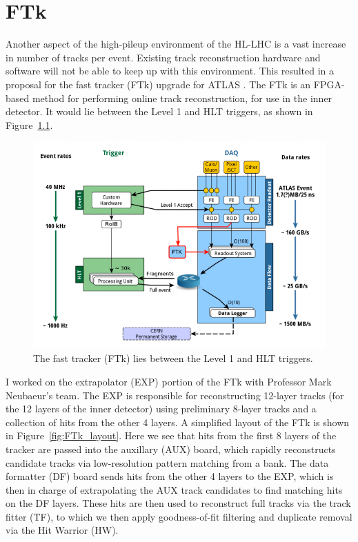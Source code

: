 \chapter{FTk}

Another aspect of the high-pileup environment of the HL-LHC is a vast increase in number of tracks per event. Existing track reconstruction hardware and software will not be able to keep up with this environment. This resulted in a proposal for the fast tracker (FTk) upgrade for ATLAS \cite{FTk}. The FTk is an FPGA-based method for performing online track reconstruction, for use in the inner detector. It would lie between the Level 1 and HLT triggers, as shown in Figure~\ref{fig:FTk_location}.

\begin{figure}[htbp]
    \centering
    \includegraphics[width=\linewidth]{Images/Other/FTk_location.png}
    \caption{The fast tracker (FTk) lies between the Level 1 and HLT triggers.}
    \label{fig:FTk_location}
\end{figure}

I worked on the extrapolator (EXP) portion of the FTk with Professor Mark Neubaeur's team. The EXP is responsible for reconstructing 12-layer tracks (for the 12 layers of the inner detector) using preliminary 8-layer tracks and a collection of hits from the other 4 layers. A simplified layout of the FTk is shown in Figure~\ref{fig:FTk_layout}. Here we see that hits from the first 8 layers of the tracker are passed into the auxillary (AUX) board, which rapidly reconstructs candidate tracks via low-resolution pattern matching from a bank. The data formatter (DF) board sends hits from the other 4 layers to the EXP, which is then in charge of extrapolating the AUX track candidates to find matching hits on the DF layers. These hits are then used to reconstruct full tracks via the track fitter (TF), to which we then apply goodness-of-fit filtering and duplicate removal via the Hit Warrior (HW).

